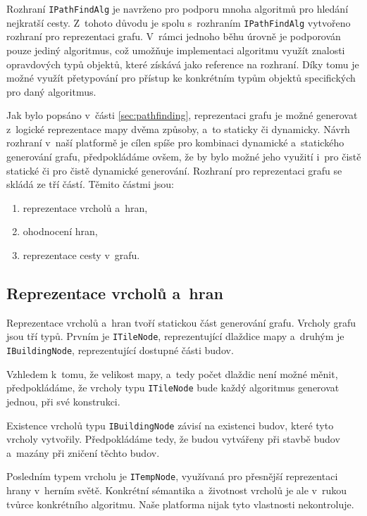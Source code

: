Rozhraní \texttt{IPathFindAlg} je navrženo pro podporu mnoha algoritmů pro hledání nejkratší cesty. Z~tohoto důvodu je spolu s~rozhraním \texttt{IPathFindAlg} vytvořeno rozhraní pro reprezentaci grafu. V~rámci jednoho běhu úrovně je podporován pouze jediný algoritmus, což umožňuje implementaci algoritmu využít znalosti opravdových typů objektů, které získává jako reference na rozhraní. Díky tomu je možné využít přetypování pro přístup ke konkrétním typům objektů specifických pro daný algoritmus.

Jak bylo popsáno v~části \ref{sec:pathfinding}, reprezentaci grafu je možné generovat z~logické reprezentace mapy dvěma způsoby, a~to staticky či dynamicky. Návrh rozhraní v~naší platformě je cílen spíše pro kombinaci dynamické a~statického generování grafu, předpokládáme ovšem, že by bylo možné jeho využití i~pro čistě statické či pro čistě dynamické generování. Rozhraní pro reprezentaci grafu se skládá ze tří částí. Těmito částmi jsou:

\begin{enumerate}
	\item reprezentace vrcholů a~hran,
	\item ohodnocení hran,
	\item reprezentace cesty v~grafu.
\end{enumerate}

\subsection{Reprezentace vrcholů a~hran}
Reprezentace vrcholů a~hran tvoří statickou část generování grafu. Vrcholy grafu jsou tří typů. Prvním je \texttt{ITileNode}, reprezentující dlaždice mapy a~druhým je \texttt{IBuildingNode}, reprezentující dostupné části budov.

Vzhledem k~tomu, že velikost mapy, a~tedy počet dlaždic není možné měnit, předpokládáme, že vrcholy typu \texttt{ITileNode} bude každý algoritmus generovat jednou, při své konstrukci. 

Existence vrcholů typu \texttt{IBuildingNode} závisí na existenci budov, které tyto vrcholy vytvořily. Předpokládáme tedy, že budou vytvářeny při stavbě budov a~mazány při zničení těchto budov. 

Posledním typem vrcholu je \texttt{ITempNode}, využívaná pro přesnější reprezentaci hrany v~herním světě. Konkrétní sémantika a~životnost vrcholů je ale v~rukou tvůrce konkrétního algoritmu. Naše platforma nijak tyto vlastnosti nekontroluje. 

